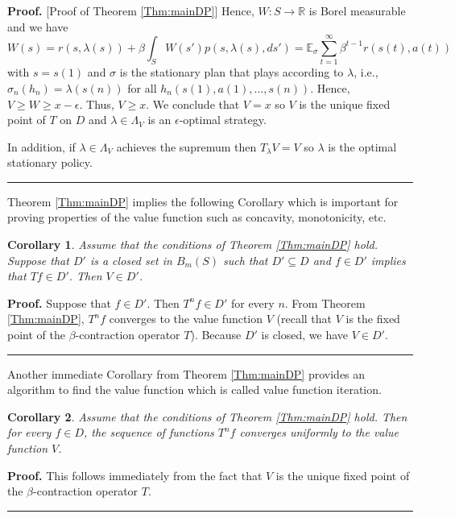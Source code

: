 \documentclass[letter,11pt]{article}
\newtheorem{corollary}{Corollary}[section]
\newenvironment {proof}[1][Proof]{\noindent \textbf {#1.} }{\ \rule {0.5em}{0.5em}}
\begin{document}
\begin{proof} [Proof of Theorem \ref{Thm:mainDP}]
 Hence, $W:S \rightarrow \mathbb{R}$ is Borel measurable and we have 
$$W (s) = r(s,\lambda(s)) + \beta \int_{S}W(s')p(s,\lambda(s),ds') = \mathbb{E}_{\sigma }\sum \limits_{t =1}^{\infty }\beta^{t -1}r(s(t),a(t)) $$
with $s=s(1)$ and $\sigma$ is the stationary plan that plays according to $\lambda$, i.e., $\sigma_{n}(h_{n}) = \lambda(s(n))$ for all $h_{n}(s(1),a(1),\ldots,s(n))$. Hence, $V \geq W \geq x - \epsilon$. Thus, $V \geq x$.  We conclude that $V=x$ so $V$ is the unique fixed point of $T$ on $D$ and $\lambda \in \Lambda_{V}$ is an $\epsilon$-optimal strategy.  

In addition, if $\lambda \in \Lambda_{V}$ achieves the supremum then 
$T_{\lambda} V = V$ so $\lambda$ is the optimal stationary policy.
\end{proof}


Theorem \ref{Thm:mainDP} implies the following Corollary which is important for proving properties of the value function such as concavity, monotonicity, etc. 

\begin{corollary} \label{Cor:prop}
    Assume that the conditions of Theorem \ref{Thm:mainDP} hold. Suppose that $D'$ is a closed set in $B_{m}(S)$ such that $D' \subseteq D$ and $f \in D'$ implies that $Tf \in D'$. Then $V \in D'$.   
\end{corollary}

\begin{proof}
   Suppose that $f \in D'$. Then $T^{n}f \in D'$ for every $n$. From Theorem \ref{Thm:mainDP}, $T^{n}f$ converges to the value function $V$ (recall that $V$ is the fixed point of the $\beta$-contraction operator $T$). Because $D'$ is closed, we have $V \in D'$. 
\end{proof}

Another immediate Corollary from Theorem  \ref{Thm:mainDP} provides an algorithm to find the value function which is called value function iteration. 

\begin{corollary}
    Assume that the conditions of Theorem \ref{Thm:mainDP} hold. Then for every $f \in D$, the sequence of functions $T^{n}f$ converges uniformly to the value function $V$. 
\end{corollary}

\begin{proof}
    This follows immediately from the fact that $V$ is the unique fixed point of the $\beta$-contraction operator $T$. 
\end{proof}
\end{document}
